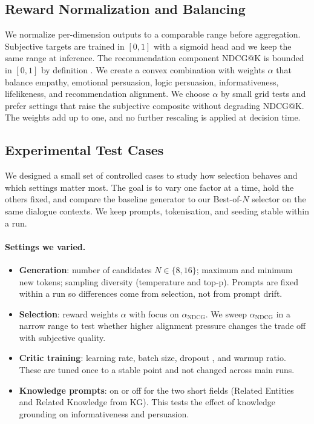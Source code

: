 \documentclass[12pt]{article}
\begin{document}
  \subsection{Reward Normalization and Balancing}
  We normalize per-dimension outputs to a comparable range before aggregation. Subjective targets are trained in $[0,1]$ with a sigmoid head and we keep the same range at inference. The recommendation component NDCG@K is bounded in $[0,1]$ by definition \citep{evidently_ndcg}. We create a convex combination with weights $\alpha$ that balance empathy, emotional persuasion, logic persuasion, informativeness, lifelikeness, and recommendation alignment. We choose $\alpha$ by small grid tests and prefer settings that raise the subjective composite without degrading NDCG@K. The weights add up to one, and no further rescaling is applied at decision time.
  
  \subsection{Experimental Test Cases}
  We designed a small set of controlled cases to study how selection behaves and which settings matter most. The goal is to vary one factor at a time, hold the others fixed, and compare the baseline generator to our Best-of-$N$ selector on the same dialogue contexts. We keep prompts, tokenisation, and seeding stable within a run.
  
  \paragraph{Settings we varied.}
  \begin{itemize}[leftmargin=*]
    \item \textbf{Generation}: number of candidates $N\in\{8,16\}$; maximum and minimum new tokens; sampling diversity (temperature and top-p). Prompts are fixed within a run so differences come from selection, not from prompt drift.
    \item \textbf{Selection}: reward weights $\alpha$ with focus on $\alpha_{\mathrm{NDCG}}$. We sweep $\alpha_{\mathrm{NDCG}}$ in a narrow range to test whether higher alignment pressure changes the trade off with subjective quality.
    \item \textbf{Critic training}: learning rate, batch size, dropout \citep{srivastava2014dropout}, and warmup ratio. These are tuned once to a stable point and not changed across main runs.
    \item \textbf{Knowledge prompts}: on or off for the two short fields (Related Entities and Related Knowledge from KG). This tests the effect of knowledge grounding on informativeness and persuasion.
  \end{itemize}
  
\end{document}
